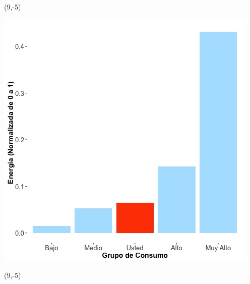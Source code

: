 \documentclass{article}\usepackage[]{graphicx}\usepackage[]{color}
\newenvironment{knitrout}{}{} %
\begin{document}
 \begin{textblock}{1}(9,-5)
\begin{minipage}{20em}
\begingroup

\endgroup
\end{minipage}
\end{textblock}


\begin{knitrout}
\color{fgcolor}
\includegraphics[scale=0.65]{figure/A25_neighbor_plot} 
\end{knitrout}

 \begin{textblock}{1}(9,-5)
\begin{minipage}{20em}
\begingroup

\endgroup
\end{minipage}
\end{textblock}
\end{document}
